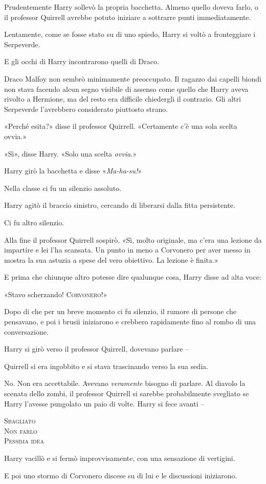 Prudentemente Harry sollevò la propria bacchetta. Almeno quello doveva farlo, o il professor Quirrell avrebbe potuto iniziare a sottrarre punti immediatamente.

Lentamente, come se fosse stato su di uno spiedo, Harry si voltò a fronteggiare i Serpeverde.

E gli occhi di Harry incontrarono quelli di Draco.

Draco Malfoy non sembrò minimamente preoccupato. Il ragazzo dai capelli biondi non stava facendo alcun segno visibile di assenso come quello che Harry aveva rivolto a Hermione, ma del resto era difficile chiedergli il contrario. Gli altri Serpeverde l’avrebbero considerato piuttosto strano.

«Perché esita?» disse il professor Quirrell. «Certamente c’è una sola scelta ovvia.»

«Sì», disse Harry. «Solo una scelta \textit{ovvia}.»

Harry girò la bacchetta e disse «\textit{Ma-ha-su!}»

Nella classe ci fu un silenzio assoluto.

Harry agitò il braccio sinistro, cercando di liberarsi dalla fitta persistente.

Ci fu altro silenzio.

Alla fine il professor Quirrell sospirò. «Sì, molto originale, ma c’era una lezione da impartire e lei l’ha scansata. Un punto in meno a Corvonero per aver messo in mostra la sua astuzia a spese del vero obiettivo. La lezione è finita.»

E prima che chiunque altro potesse dire qualunque cosa, Harry disse ad alta voce:

«Stavo scherzando! \textsc{Corvonero!}»

Dopo di che per un breve momento ci fu silenzio, il rumore di persone che pensavano, e poi i brusii iniziarono e crebbero rapidamente fino al rombo di una conversazione.

Harry si girò verso il professor Quirrell, dovevano parlare –

Quirrell si era ingobbito e si stava trascinando verso la sua sedia.

No. Non era accettabile. Avevano \textit{veramente} bisogno di parlare. Al diavolo la scenata dello zombi, il professor Quirrell si sarebbe probabilmente svegliato se Harry l’avesse pungolato un paio di volte. Harry si fece avanti –

\textsc{Sbagliato}\\
\textsc{Non farlo}\\
\textsc{Pessima idea}

Harry vacillò e si fermò improvvisamente, con una sensazione di vertigini.

E poi uno stormo di Corvonero discese su di lui e le discussioni iniziarono.



